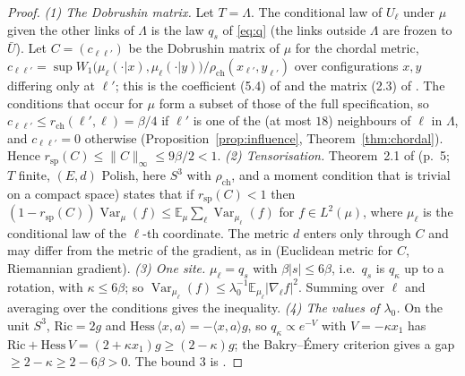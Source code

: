 \documentclass[11pt,a4paper]{article}
\theoremstyle{remark}
\theoremstyle{definition}
\theoremstyle{plain}
\theoremstyle{remark}
\newcommand{\E}{\mathbb{E}}
\newcommand{\Var}{\operatorname{Var}}
\newcommand{\rch}{\rho_{\mathrm{ch}}}
\begin{document}
\begin{proof}
\emph{(1) The Dobrushin matrix.} Let $T=\Lambda$. The conditional law of $U_\ell$ under $\mu$ given the other links of $\Lambda$ is the law $q_s$ of \eqref{eq:q} (the links outside $\Lambda$ are frozen to $\bar U$).
Let $C=(c_{\ell\ell'})$ be the Dobrushin matrix of $\mu$ for the chordal metric, $c_{\ell\ell'}=\sup W_1\big(\mu_\ell(\cdot|x),\mu_\ell(\cdot|y)\big)/\rch(x_{\ell'},y_{\ell'})$ over configurations $x,y$ differing only at $\ell'$;
this is the coefficient (5.4) of \cite{Dob70} and the matrix (2.3) of \cite{Wu06}. The conditions that occur for $\mu$ form a subset of those of the full specification, so
$c_{\ell\ell'}\le r_{\mathrm{ch}}(\ell',\ell)=\beta/4$ if $\ell'$ is one of the (at most $18$) neighbours of $\ell$ in $\Lambda$, and $c_{\ell\ell'}=0$ otherwise (Proposition~\ref{prop:influence}, Theorem~\ref{thm:chordal}).
Hence $r_{\mathrm{sp}}(C)\le\|C\|_\infty\le9\beta/2<1$.
\emph{(2) Tensorisation.} Theorem~2.1 of \cite{Wu06} (p.~5; $T$ finite, $(E,d)$ Polish, here $S^3$ with $\rch$, and a moment condition that is trivial on a compact space) states that if $r_{\mathrm{sp}}(C)<1$ then
$(1-r_{\mathrm{sp}}(C))\Var_\mu(f)\le\E_\mu\sum_\ell\Var_{\mu_\ell}(f)$ for $f\in L^2(\mu)$, where $\mu_\ell$ is the conditional law of the $\ell$-th coordinate. The metric $d$ enters only through $C$ and may differ from the metric of the gradient,
as in \cite[Prop.~5.5]{Wu06} (Euclidean metric for $C$, Riemannian gradient).
\emph{(3) One site.} $\mu_\ell=q_s$ with $\beta|s|\le6\beta$, i.e.\ $q_s$ is $q_\kappa$ up to a rotation, with $\kappa\le6\beta$; so $\Var_{\mu_\ell}(f)\le\lambda_0^{-1}\E_{\mu_\ell}|\nabla_\ell f|^2$. Summing over $\ell$ and averaging over the conditions gives the inequality.
\emph{(4) The values of $\lambda_0$.} On the unit $S^3$, $\mathrm{Ric}=2g$ and $\mathrm{Hess}\,\langle x,a\rangle=-\langle x,a\rangle g$, so $q_\kappa\propto e^{-V}$ with $V=-\kappa x_1$ has
$\mathrm{Ric}+\mathrm{Hess}\,V=(2+\kappa x_1)g\ge(2-\kappa)g$; the Bakry--\'Emery criterion gives a gap $\ge2-\kappa\ge2-6\beta>0$. The bound $3$ is \cite[Lemma~4]{BB26}.
\end{proof}
\end{document}
